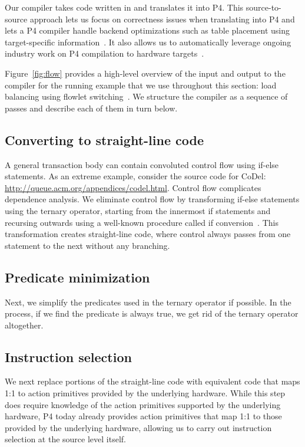 Our compiler takes code written in \pktlanguage and translates it into P4. This
source-to-source approach lets us focus on correctness issues when translating
\pktlanguage into P4 and lets a P4 compiler handle backend optimizations such
as table placement using target-specific information~\cite{lavanya_compiler}.
It also allows us to automatically leverage ongoing industry work on P4
compilation to hardware targets~\cite{netronome, xilinx}.

Figure~\ref{fig:flow} provides a high-level overview of the input and output to
the compiler for the running example that we use throughout this section: load
balancing using flowlet switching~\cite{flowlets}.  We structure the compiler
as a sequence of passes and describe each of them in turn below. 

\subsection{Converting to straight-line code}
A general transaction body can contain convoluted control flow using if-else
statements. As an extreme example, consider the source code for CoDel:
\url{http://queue.acm.org/appendices/codel.html}. Control flow complicates
dependence analysis. We eliminate control flow by transforming if-else
statements using the ternary operator, starting from the innermost if
statements and recursing outwards using a well-known procedure called if
conversion~\cite{allen_if_conversion}.  This transformation creates
straight-line code, where control always passes from one statement to the next
without any branching.

\subsection{Predicate minimization}
Next, we simplify the predicates used in the ternary operator if possible.  In
the process, if we find the predicate is always true, we get rid of the ternary
operator altogether.

\subsection{Instruction selection}
We next replace portions of the straight-line code with equivalent code that
maps 1:1 to action primitives provided by the underlying hardware. While this
step does require knowledge of the action primitives supported by the
underlying hardware, P4 today already provides action primitives that map
1:1 to those provided by the underlying hardware, allowing us to carry out
instruction selection at the source level itself.

